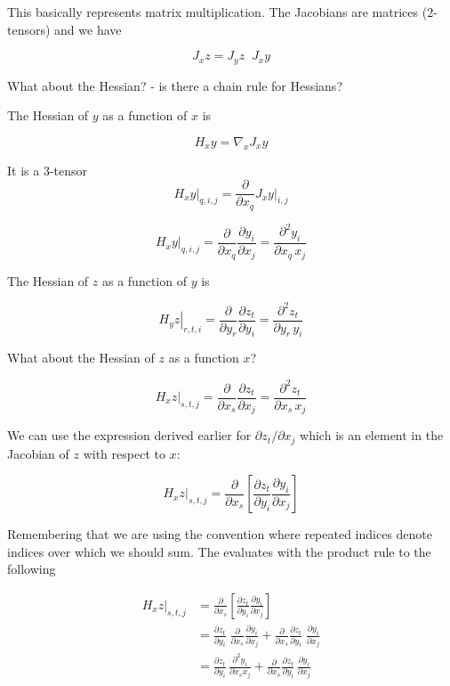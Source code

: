 \documentclass[11pt]{amsart}
\begin{document}
This basically represents matrix multiplication.
The Jacobians are matrices (2-tensors) and we have

$$
J_{x} z = J_{y} z \; \; J_{x} y
$$


What about the Hessian? - is there a chain rule for Hessians?


The Hessian of $y$ as a function of $x$ is

$$
H_{x} y = \nabla_{x} J_{x} y
$$

It is a 3-tensor
$$
\left.
H_{x} y \right\vert_{q,i,j} = 
\frac{\partial}{\partial x_{q}}
J_{x} y \vert_{i,j}
$$


$$
\left.
H_{x} y \right\vert_{q,i,j} = 
\frac{\partial}{\partial x_{q}}
\frac{\partial y_{i}}{\partial x_{j}}
=
\frac{\partial^{2} y_{i}}{\partial x_{q} \, x_{j}}
$$


The Hessian of $z$ as a function of $y$ is

$$
\left.
H_{y} z \right\vert_{r,t,i} = 
\frac{\partial}{\partial y_{r}}
\frac{\partial z_{t}}{\partial y_{i}}
=
\frac{\partial^{2} z_{t}}{\partial y_{r} \, y_{i}}
$$

What about the Hessian of $z$ as a function $x$?




$$
\left.
H_{x} z \right\vert_{s,t,j} = 
\frac{\partial}{\partial x_{s}}
\frac{\partial z_{t}}{\partial x_{j}}
=
\frac{\partial^{2} z_{t}}{\partial x_{s} \, x_{j}}
$$

We can use the expression derived earlier for $\partial z_{t}/\partial x_{j}$ which is an element in the Jacobian of $z$ with respect to $x$:

$$
\left.
H_{x} z \right\vert_{s,t,j} = 
\frac{\partial}{\partial x_{s}}
\left[
\frac{\partial z_{t}}{\partial y_{i}}
\frac{\partial y_{i}}{\partial x_{j}}
\right]
$$

Remembering that we are using the convention where repeated indices denote indices over which we should sum. The evaluates with the product rule to the following

$$
\begin{aligned}
\left.
H_{x} z \right\vert_{s,t,j} &
= 
\frac{\partial}{\partial x_{s}}
\left[
\frac{\partial z_{t}}{\partial y_{i}}
\frac{\partial y_{i}}{\partial x_{j}}
\right]
\\
&=
\frac{\partial z_{t}}{\partial y_{i}}
\;
\frac{\partial}{\partial x_{s}}
\frac{\partial y_{i}}{\partial x_{j}}
+
\frac{\partial}{\partial x_{s}}
\frac{\partial z_{t}}{\partial y_{i}}
\;
\frac{\partial y_{i}}{\partial x_{j}}
\\
&=
\frac{\partial z_{t}}{\partial y_{i}}
\,
\frac{\partial^{2} y_{i}}{\partial x_{s} x_{j}}
+
\frac{\partial}{\partial x_{s}}
\frac{\partial z_{t}}{\partial y_{i}}
\,
\frac{\partial y_{i}}{\partial x_{j}}
\end{aligned}
$$
\end{document}
